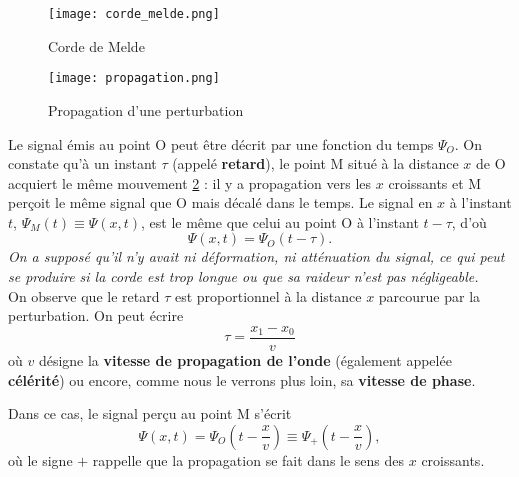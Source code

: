 \documentclass[11pt,a4paper]{report}
\begin{document}
\begin{figure}[h!]
\begin{center}
	\texttt{[image: corde\_melde.png]}
	\caption{Corde de Melde} 
	\label{fig:corde_melde}
\end{center}
\end{figure}

\begin{figure}[h!]
\begin{center}
	\texttt{[image: propagation.png]}
	\caption{Propagation d'une perturbation} 
	\label{fig:propagation}
\end{center}
\end{figure}

Le signal émis au point O peut être décrit par une fonction du temps $\Psi_O$. On constate qu'à un instant $\tau$ (appelé \textbf{retard}), le point M situé à la distance $x$ de O acquiert le même mouvement \ref{fig:propagation} : il y a propagation vers les $x$ croissants et M perçoit le même signal que O mais décalé dans le temps. Le signal en $x$ à l'instant $t$, $\Psi_M(t) \equiv \Psi(x,t)$, est le même que celui au point O à l'instant $t-\tau$, d'où
\begin{equation}
	\Psi(x,t) = \Psi_O(t-\tau).
\end{equation} 
\textit{On a supposé qu'il n'y avait ni déformation, ni atténuation du signal, ce qui peut se produire si la corde est trop longue ou que sa raideur n'est pas négligeable.}\\

On observe que le retard $\tau$ est proportionnel à la distance $x$ parcourue par la perturbation. On peut écrire 
\begin{equation}
	\tau = \frac{x_1 - x_0}{v}
\end{equation}
où $v$ désigne la \textbf{vitesse de propagation de l'onde} (également appelée \textbf{célérité}) ou encore, comme nous le verrons plus loin, sa \textbf{vitesse de phase}.

Dans ce cas, le signal perçu au point M s'écrit
\begin{equation}
	\Psi(x,t) = \Psi_O(t-\frac{x}{v}) \equiv \Psi_+(t-\frac{x}{v}),
\end{equation} 
où le signe $+$ rappelle que la propagation se fait dans le sens des $x$ croissants.\\
\end{document}
